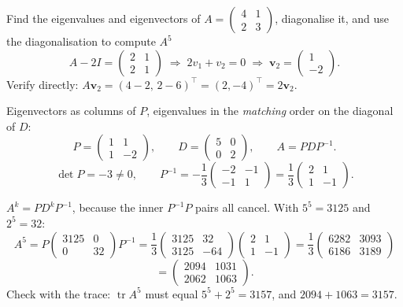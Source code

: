 \begin{worked}{Find the eigenvalues and eigenvectors of $A=\begin{pmatrix}4&1\\2&3\end{pmatrix}$, diagonalise it, and use the diagonalisation to compute $A^{5}$}
\[
  A-2I=\begin{pmatrix}2&1\\2&1\end{pmatrix}
  \;\Longrightarrow\;
  2v_{1}+v_{2}=0
  \;\Longrightarrow\;
  \mathbf v_{2}=\begin{pmatrix}1\\-2\end{pmatrix}.
\]
Verify directly: $A\mathbf v_{2}=(4-2,\,2-6)^{\!\top}=(2,-4)^{\!\top}
=2\mathbf v_{2}$. \checkmark
{}

Eigenvectors as columns of $P$, eigenvalues in the \emph{matching} order on
the diagonal of $D$:
\[
  P=\begin{pmatrix}1&1\\1&-2\end{pmatrix},\qquad
  D=\begin{pmatrix}5&0\\0&2\end{pmatrix},\qquad
  A=PDP^{-1}.
\]
\[
  \det P=-3\neq0,\qquad
  P^{-1}=-\frac13\begin{pmatrix}-2&-1\\-1&1\end{pmatrix}
        =\frac13\begin{pmatrix}2&1\\1&-1\end{pmatrix}.
\]

$A^{k}=PD^{k}P^{-1}$, because the inner $P^{-1}P$ pairs all cancel. With
$5^{5}=3125$ and $2^{5}=32$:
\[
  A^{5}=P\begin{pmatrix}3125&0\\0&32\end{pmatrix}P^{-1}
  =\frac13\begin{pmatrix}3125&32\\3125&-64\end{pmatrix}
   \begin{pmatrix}2&1\\1&-1\end{pmatrix}
  =\frac13\begin{pmatrix}6282&3093\\6186&3189\end{pmatrix}
\]
\[
  =\begin{pmatrix}2094&1031\\2062&1063\end{pmatrix}.
\]
Check with the trace: $\operatorname{tr}A^{5}$ must equal
$5^{5}+2^{5}=3157$, and $2094+1063=3157$. \checkmark


\end{worked}
